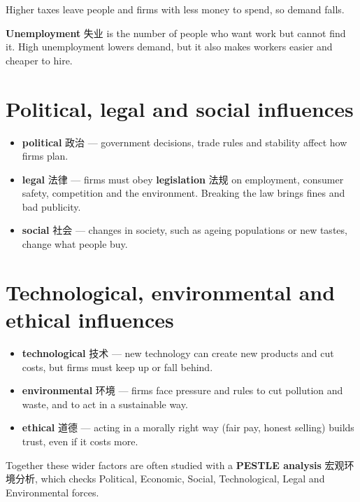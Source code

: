 \documentclass[11pt]{article}
\begin{document}
Higher taxes leave people and firms with less money to spend, so demand falls.

\textbf{Unemployment} 失业 is the number of people who want work but cannot find it. High unemployment lowers demand, but it also makes workers easier and cheaper to hire.

\section*{Political, legal and social influences}

\begin{itemize}
\item \textbf{political} 政治 — government decisions, trade rules and stability affect how firms plan.

\item \textbf{legal} 法律 — firms must obey \textbf{legislation} 法规 on employment, consumer safety, competition and the environment. Breaking the law brings fines and bad publicity.

\item \textbf{social} 社会 — changes in society, such as ageing populations or new tastes, change what people buy.

\end{itemize}

\section*{Technological, environmental and ethical influences}

\begin{itemize}
\item \textbf{technological} 技术 — new technology can create new products and cut costs, but firms must keep up or fall behind.

\item \textbf{environmental} 环境 — firms face pressure and rules to cut pollution and waste, and to act in a sustainable way.

\item \textbf{ethical} 道德 — acting in a morally right way (fair pay, honest selling) builds trust, even if it costs more.

\end{itemize}

Together these wider factors are often studied with a \textbf{PESTLE analysis} 宏观环境分析, which checks Political, Economic, Social, Technological, Legal and Environmental forces.
\end{document}
